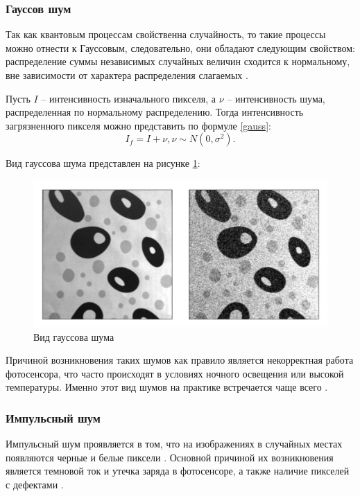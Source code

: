 \subsubsection{Гауссов шум}
Так как квантовым процессам свойственна случайность, то такие процессы можно отнести к Гауссовым, следовательно, они обладают следующим свойством: распределение суммы независимых случайных величин сходится к нормальному, вне зависимости от характера распределения слагаемых \cite{inproceedings}.

Пусть $I$ -- интенсивность изначального пикселя, а $\nu$ -- интенсивность шума, распределенная по нормальному распределению. 
Тогда интенсивность загрязненного пикселя можно представить по формуле \ref{gauss}: 
\begin{equation}
	\label{gauss}
	I_f = I + \nu,  \nu \sim N(0, \sigma^2).
\end{equation}


Вид гауссова шума представлен на рисунке \ref{fig::gaussSh}:
\FloatBarrier
\begin{figure}[h]	
	\begin{center}
		\includegraphics[width=\linewidth]{inc/png/gaussShum.png}
	\end{center}
	\captionsetup{justification=centering}
	\caption{Вид гауссова шума}
	\label{fig::gaussSh}
\end{figure}
\FloatBarrier

Причиной возникновения таких шумов как правило является некорректная работа фотосенсора, что часто происходят в условиях ночного освещения или высокой температуры.
Именно этот вид шумов на практике встречается чаще всего \cite{filterTechincs}. 

\subsubsection{Импульсный шум}
Импульсный шум проявляется в том, что на изображениях в случайных местах появляются черные и белые пиксели \cite{moments}.
Основной причиной их возникновения является темновой ток и утечка заряда в фотосенсоре, а также наличие пикселей с дефектами \cite{shum}.

